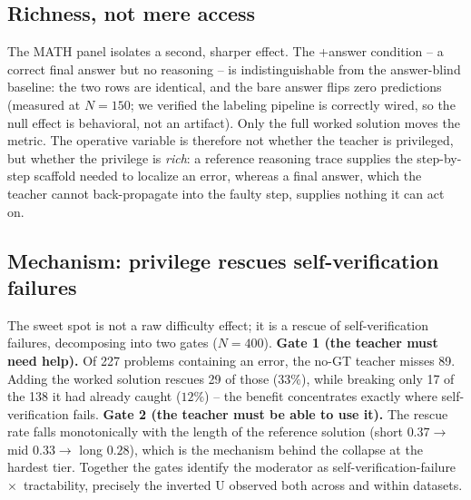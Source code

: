 \documentclass[11pt]{article}
\begin{document}
\subsection{Richness, not mere access}
The MATH panel isolates a second, sharper effect. The +answer condition --
a correct final answer but no reasoning -- is indistinguishable from the
answer-blind baseline: the two rows are identical, and the bare answer flips
zero predictions (measured at $N=150$; we verified the labeling pipeline is
correctly wired, so the null effect is behavioral, not an artifact). Only
the full worked solution moves the metric. The operative variable is
therefore not whether the teacher is privileged, but whether the privilege
is \emph{rich}: a reference reasoning trace supplies the step-by-step
scaffold needed to localize an error, whereas a final answer, which the
teacher cannot back-propagate into the faulty step, supplies nothing it can
act on.

\subsection{Mechanism: privilege rescues self-verification failures}
\label{sec:mechanism}
The sweet spot is not a raw difficulty effect; it is a rescue of
self-verification failures, decomposing into two gates ($N=400$). \textbf{Gate
1 (the teacher must need help).} Of 227 problems containing an error, the
no-GT teacher misses 89. Adding the worked solution rescues 29 of those
($33\%$), while breaking only 17 of the 138 it had already caught ($12\%$) --
the benefit concentrates exactly where self-verification fails. \textbf{Gate
2 (the teacher must be able to use it).} The rescue rate falls monotonically
with the length of the reference solution (short $0.37 \to$ mid $0.33 \to$
long $0.28$), which is the mechanism behind the collapse at the hardest
tier. Together the gates identify the moderator as
self-verification-failure~$\times$~tractability, precisely the inverted U
observed both across and within datasets.
\end{document}
